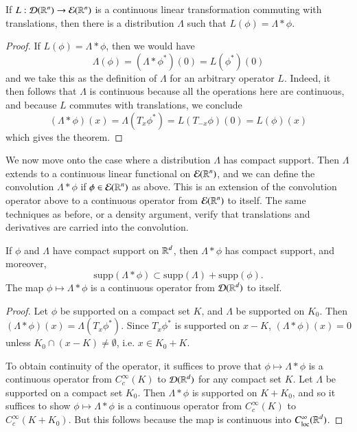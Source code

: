 \begin{theorem}
    If $L: \operatorname{\mathcal{D}}(\operatorname{\mathbb{R}}^n) \to \operatorname{\mathcal{E}}(\operatorname{\mathbb{R}}^n)$ is a continuous linear transformation commuting with translations, then there is a distribution $\Lambda$ such that $L(\phi) = \Lambda * \phi$.
\end{theorem}
\begin{proof}
    If $L(\phi) = \Lambda * \phi$, then we would have
    \[ \Lambda(\phi) = (\Lambda * \phi^*)(0) = L(\phi^*)(0) \]
    and we take this as the definition of $\Lambda$ for an arbitrary operator $L$. Indeed, it then follows that $\Lambda$ is continuous because all the operations here are continuous, and because $L$ commutes with translations, we conclude
    \[ (\Lambda * \phi)(x) = \Lambda(T_x \phi^*) = L(T_{-x} \phi)(0) = L(\phi)(x) \]
    which gives the theorem.
\end{proof}

We now move onto the case where a distribution $\Lambda$ has compact support. Then $\Lambda$ extends to a continuous linear functional on $\operatorname{\mathcal{E}}(\operatorname{\mathbb{R}}^n)$, and we can define the convolution $\Lambda * \phi$ if $\phi \in \operatorname{\mathcal{E}}(\operatorname{\mathbb{R}}^n)$ as above. This is an extension of the convolution operator above to a continuous operator from $\mathcal{E}(\operatorname{\mathbb{R}}^n)$ to itself. The same techniques as before, or a density argument, verify that translations and derivatives are carried into the convolution.

\begin{theorem}
    If $\phi$ and $\Lambda$ have compact support on $\operatorname{\mathbb{R}}^d$, then $\Lambda * \phi$ has compact support, and moreover,
    \[ \text{supp}(\Lambda * \phi) \subset \text{supp}(\Lambda) + \text{supp}(\phi). \]
    The map $\phi \mapsto \Lambda * \phi$ is a continuous operator from $\mathcal{D}(\operatorname{\mathbb{R}}^d)$ to itself.
\end{theorem}
\begin{proof}
    Let $\phi$ be supported on a compact set $K$, and $\Lambda$ be supported on $K_0$. Then $(\Lambda * \phi)(x) = \Lambda(T_x \phi^*)$. Since $T_x \phi^*$ is supported on $x - K$, $(\Lambda * \phi)(x) = 0$ unless $K_0 \cap (x - K) \neq \emptyset$, i.e. $x \in K_0 + K$.

    To obtain continuity of the operator, it suffices to prove that $\phi \mapsto \Lambda * \phi$ is a continuous operator from $C_c^\infty(K)$ to $\operatorname{\mathcal{D}}(\operatorname{\mathbb{R}}^d)$ for any compact set $K$. Let $\Lambda$ be supported on a compact set $K_0$. Then $\Lambda * \phi$ is supported on $K + K_0$, and so it suffices to show $\phi \mapsto \Lambda * \phi$ is a continuous operator from $C_c^\infty(K)$ to $C_c^\infty(K + K_0)$. But this follows because the map is continuous into $C^\infty_{\text{loc}}(\operatorname{\mathbb{R}}^d)$.
\end{proof}


